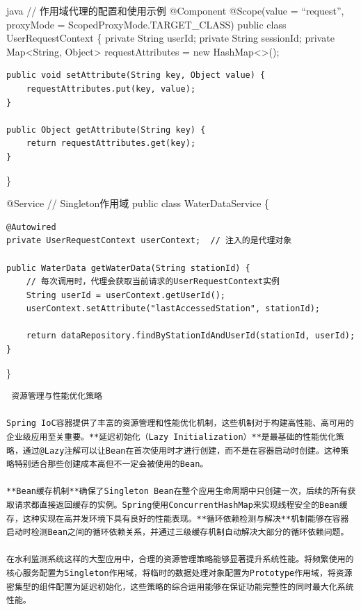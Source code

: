 java // 作用域代理的配置和使用示例 @Component @Scope(value = ``request'', proxyMode = ScopedProxyMode.TARGET\_CLASS) public class UserRequestContext \{ private String userId; private String sessionId; private Map\textless String, Object\textgreater{} requestAttributes = new HashMap\textless\textgreater();

\begin{verbatim}
public void setAttribute(String key, Object value) {
    requestAttributes.put(key, value);
}

public Object getAttribute(String key) {
    return requestAttributes.get(key);
}
\end{verbatim}

\}

@Service // Singleton作用域 public class WaterDataService \{

\begin{verbatim}
@Autowired
private UserRequestContext userContext;  // 注入的是代理对象

public WaterData getWaterData(String stationId) {
    // 每次调用时，代理会获取当前请求的UserRequestContext实例
    String userId = userContext.getUserId();
    userContext.setAttribute("lastAccessedStation", stationId);
    
    return dataRepository.findByStationIdAndUserId(stationId, userId);
}
\end{verbatim}

\}

\begin{lstlisting}
 资源管理与性能优化策略

Spring IoC容器提供了丰富的资源管理和性能优化机制，这些机制对于构建高性能、高可用的企业级应用至关重要。**延迟初始化（Lazy Initialization）**是最基础的性能优化策略，通过@Lazy注解可以让Bean在首次使用时才进行创建，而不是在容器启动时创建。这种策略特别适合那些创建成本高但不一定会被使用的Bean。

**Bean缓存机制**确保了Singleton Bean在整个应用生命周期中只创建一次，后续的所有获取请求都直接返回缓存的实例。Spring使用ConcurrentHashMap来实现线程安全的Bean缓存，这种实现在高并发环境下具有良好的性能表现。**循环依赖检测与解决**机制能够在容器启动时检测Bean之间的循环依赖关系，并通过三级缓存机制自动解决大部分的循环依赖问题。

在水利监测系统这样的大型应用中，合理的资源管理策略能够显著提升系统性能。将频繁使用的核心服务配置为Singleton作用域，将临时的数据处理对象配置为Prototype作用域，将资源密集型的组件配置为延迟初始化，这些策略的综合运用能够在保证功能完整性的同时最大化系统性能。
\end{lstlisting}

